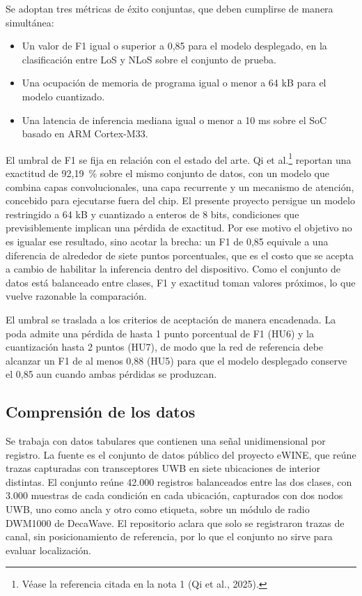 \documentclass[
11pt, %
]{charter}
\begin{document}
Se adoptan tres métricas de éxito conjuntas, que deben cumplirse de manera simultánea:

\begin{itemize}
    \item Un valor de F1 igual o superior a 0,85 para el modelo desplegado, en la clasificación entre LoS y NLoS sobre el conjunto de prueba.
    \item Una ocupación de memoria de programa igual o menor a 64 kB para el modelo cuantizado.
    \item Una latencia de inferencia mediana igual o menor a 10 ms sobre el SoC basado en ARM Cortex-M33.
\end{itemize}

El umbral de F1 se fija en relación con el estado del arte. Qi et al.\footnote{Véase la referencia citada en la nota 1 (Qi et al., 2025).} reportan una exactitud de 92,19~\% sobre el mismo conjunto de datos, con un modelo que combina capas convolucionales, una capa recurrente y un mecanismo de atención, concebido para ejecutarse fuera del chip. El presente proyecto persigue un modelo restringido a 64 kB y cuantizado a enteros de 8 bits, condiciones que previsiblemente implican una pérdida de exactitud. Por ese motivo el objetivo no es igualar ese resultado, sino acotar la brecha: un F1 de 0,85 equivale a una diferencia de alrededor de siete puntos porcentuales, que es el costo que se acepta a cambio de habilitar la inferencia dentro del dispositivo. Como el conjunto de datos está balanceado entre clases, F1 y exactitud toman valores próximos, lo que vuelve razonable la comparación.

El umbral se traslada a los criterios de aceptación de manera encadenada. La poda admite una pérdida de hasta 1 punto porcentual de F1 (HU6) y la cuantización hasta 2 puntos (HU7), de modo que la red de referencia debe alcanzar un F1 de al menos 0,88 (HU5) para que el modelo desplegado conserve el 0,85 aun cuando ambas pérdidas se produzcan.

\subsection{Comprensión de los datos}

Se trabaja con datos tabulares que contienen una señal unidimensional por registro. La fuente es el conjunto de datos público del proyecto eWINE, que reúne trazas capturadas con transceptores UWB en siete ubicaciones de interior distintas. El conjunto reúne 42.000 registros balanceados entre las dos clases, con 3.000 muestras de cada condición en cada ubicación, capturados con dos nodos UWB, uno como ancla y otro como etiqueta, sobre un módulo de radio DWM1000 de DecaWave. El repositorio aclara que solo se registraron trazas de canal, sin posicionamiento de referencia, por lo que el conjunto no sirve para evaluar localización.
\end{document}
